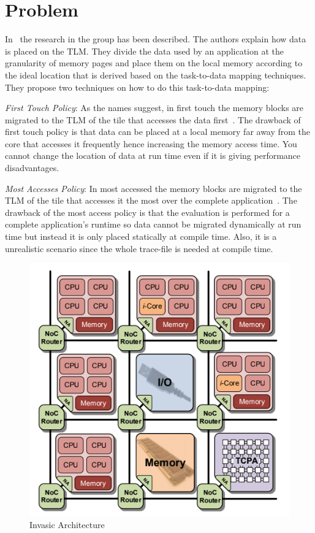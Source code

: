 \documentclass{listhesis}
\begin{document}
\section{Problem}
In~\cite{lispaper} the research in the group has been described. The authors explain how data is placed on the TLM. They divide the data used by an application at the granularity of memory pages and place them on the local memory according to the ideal location that is derived based on the task-to-data mapping techniques. They propose two techniques on how to do this task-to-data mapping:\\
\par
\textit{First Touch Policy}: As the names suggest, in first touch the memory blocks are migrated to the TLM of the tile that accesses the data first~\cite{lispaper}. The drawback of first touch policy is that data can be placed at a local memory far away from the core that accesses it frequently hence increasing the memory access time. You cannot change the location of data at run time even if it is giving performance disadvantages.\\ 
\par
\textit{Most Accesses Policy}: In most accessed the memory blocks are migrated to the TLM of the tile that accesses it the most over the complete application~\cite{lispaper}. The drawback of the most access policy is that the evaluation is performed for a complete application's runtime so data cannot be migrated dynamically at run time but instead it is only placed statically at compile time. Also, it is a unrealistic scenario since the whole trace-file is needed at compile time. 
\begin{figure}[h!]
  \includegraphics[width=0.7\linewidth]{multi-core,tile.png}
  \centering
  \caption{Invasic Architecture~\cite{iNetworkAdapter}}
  \label{fig:multi-core,tile}
\end{figure}
\end{document}
